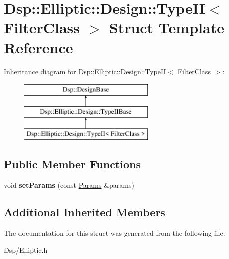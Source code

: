 \hypertarget{structDsp_1_1Elliptic_1_1Design_1_1TypeII}{\section{Dsp\-:\-:Elliptic\-:\-:Design\-:\-:Type\-I\-I$<$ Filter\-Class $>$ Struct Template Reference}
\label{structDsp_1_1Elliptic_1_1Design_1_1TypeII}
}
Inheritance diagram for Dsp\-:\-:Elliptic\-:\-:Design\-:\-:Type\-I\-I$<$ Filter\-Class $>$\-:\begin{figure}[H]
\begin{center}
\leavevmode
\includegraphics[height=3.000000cm]{structDsp_1_1Elliptic_1_1Design_1_1TypeII}
\end{center}
\end{figure}
\subsection*{Public Member Functions}
\begin{DoxyCompactItemize}
\item 
\hypertarget{structDsp_1_1Elliptic_1_1Design_1_1TypeII_aaec3eb5456dabcded29503b227aa9501}{void {\bfseries set\-Params} (const \hyperlink{structDsp_1_1Params}{Params} \&params)}\label{structDsp_1_1Elliptic_1_1Design_1_1TypeII_aaec3eb5456dabcded29503b227aa9501}

\end{DoxyCompactItemize}
\subsection*{Additional Inherited Members}


The documentation for this struct was generated from the following file\-:\begin{DoxyCompactItemize}
\item 
Dsp/Elliptic.\-h\end{DoxyCompactItemize}
